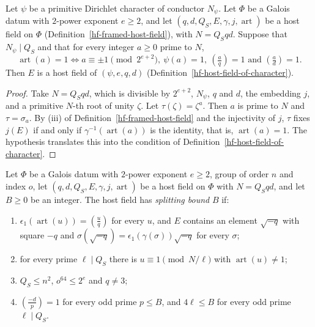 \begin{lemma}\label{hf-kernel-host-field}
Let $\psi$ be a primitive Dirichlet character of conductor $N_\psi$. Let $\Phi$ be a Galois datum with
$2$-power exponent $e\geq2$, and let $(q,d,Q_S,E,\gamma,j,\operatorname{art})$ be a host field on
$\Phi$ (Definition~\ref{hf-framed-host-field}), with $N=Q_Sqd$. Suppose that $N_\psi\mid Q_S$ and
that for every integer $a\geq0$ prime to $N$,
\[
 \operatorname{art}(a)=1\iff a\equiv\pm1\pmod{2^{e+2}},\ \psi(a)=1,\
 \left(\tfrac aq\right)=1\text{ and }\left(\tfrac ad\right)=1.
\]
Then $E$ is a host field of $(\psi,e,q,d)$ (Definition~\ref{hf-host-field-of-character}).
\end{lemma}

\begin{proof}
Take $N=Q_Sqd$, which is divisible by $2^{e+2}$, $N_\psi$, $q$ and $d$, the embedding $j$, and a
primitive $N$-th root of unity $\zeta$. Let $\tau(\zeta)=\zeta^a$. Then $a$ is prime to $N$ and
$\tau=\sigma_a$. By (iii) of Definition~\ref{hf-framed-host-field} and the injectivity of $j$,
$\tau$ fixes $j(E)$ if and only if $\gamma^{-1}(\operatorname{art}(a))$ is the identity, that is,
$\operatorname{art}(a)=1$. The hypothesis translates this into the condition of
Definition~\ref{hf-host-field-of-character}.
\end{proof}

\begin{definition}\label{hf-host-field-rows}
Let $\Phi$ be a Galois datum with $2$-power exponent $e\geq2$, group of order $n$ and index $o$, let
$(q,d,Q_S,E,\gamma,j,\operatorname{art})$ be a host field on $\Phi$ with $N=Q_Sqd$, and let $B\geq0$
be an integer. The host field has \emph{splitting bound} $B$ if:
\begin{enumerate}
\item $\epsilon_1(\operatorname{art}(u))=\left(\frac uq\right)$ for every $u$, and $E$ contains an
  element $\sqrt{-q}$ with square $-q$ and $\sigma(\sqrt{-q})=\epsilon_1(\gamma(\sigma))\sqrt{-q}$
  for every $\sigma$;
\item for every prime $\ell\mid Q_S$ there is $u\equiv1\pmod{N/\ell}$ with
  $\operatorname{art}(u)\neq1$;
\item $Q_S\leq n^2$, $o^{64}\leq2^e$ and $q\neq3$;
\item $\left(\frac{-d}{p}\right)=1$ for every odd prime $p\leq B$, and $4\ell\leq B$ for every odd
  prime $\ell\mid Q_S$.
\end{enumerate}
\end{definition}

